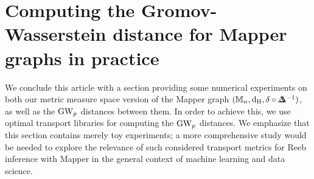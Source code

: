 %
%
%
%
%
%
%
\section{Computing the Gromov-Wasserstein distance for Mapper graphs in practice}\label{sec:appl}


We conclude this article with a section providing some numerical experiments
 on both our metric measure space version of the Mapper graph $({\mathbb{M}_n},{\mathrm {d_H}},\delta\circ\Delta\!\!\!\!\Delta^{-1})$, %
 as well as the $\mathrm{GW}_p$ distances between them. In order to achieve this,  %
 we use optimal transport libraries for computing the $\mathrm{GW}_p$ distances. 
 We emphasize that this section contains merely toy experiments; a more comprehensive study would be needed to explore the relevance of such considered transport metrics for Reeb inference with Mapper in the general context of  machine learning and data science.


